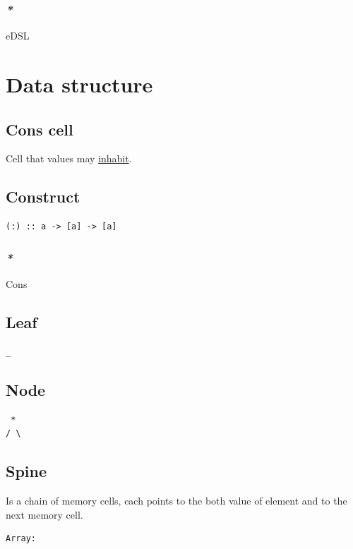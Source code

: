\documentclass[a4paper,14pt,oneside]{book}
\begin{document}
{\subsubsection{\emph{*}}
\label{sec:org7bfa018}

\label{org355da77}eDSL\\

\section{\label{orgbe03dd5}Data structure}
\label{sec:orgc380987}
\subsection{\label{orgc081a16}Cons cell}
\label{sec:orgf86400e}
Cell that values may \hyperref[org6e7696d]{inhabit}.\\

\subsection{\label{orgadd667a}Construct}
\label{sec:org2b55247}
\begin{verbatim}
(:) :: a -> [a] -> [a]
\end{verbatim}

\subsubsection{\emph{*}}
\label{sec:org234e291}

\label{orgc796c88}Cons\\

\subsection{\label{orgaa6c2e2}Leaf}
\label{sec:orgc5c83d7}
\begin{verbatim}
_
\end{verbatim}

\subsection{\label{org79dddc3}Node}
\label{sec:orgd5c7809}
\begin{verbatim}
 *
/ \
\end{verbatim}

\subsection{\label{orgbaee92e}Spine}
\label{sec:org9f0449e}
Is a chain of memory cells, each points to the both value of element and to the next memory cell.\\
\begin{verbatim}
Array:


\end{verbatim}}
\end{document}
